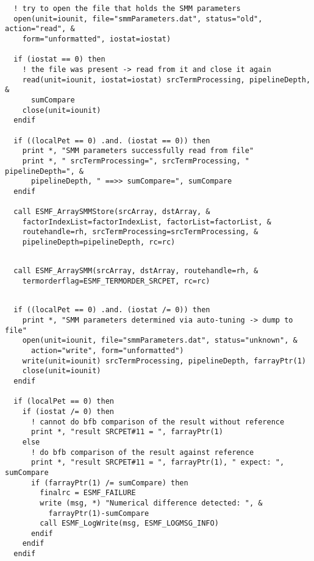  \begin{verbatim}
  ! try to open the file that holds the SMM parameters
  open(unit=iounit, file="smmParameters.dat", status="old", action="read", &
    form="unformatted", iostat=iostat)
  
  if (iostat == 0) then
    ! the file was present -> read from it and close it again
    read(unit=iounit, iostat=iostat) srcTermProcessing, pipelineDepth, &
      sumCompare
    close(unit=iounit)
  endif
  
  if ((localPet == 0) .and. (iostat == 0)) then
    print *, "SMM parameters successfully read from file"
    print *, " srcTermProcessing=", srcTermProcessing, " pipelineDepth=", &
      pipelineDepth, " ==>> sumCompare=", sumCompare
  endif

  call ESMF_ArraySMMStore(srcArray, dstArray, &
    factorIndexList=factorIndexList, factorList=factorList, &
    routehandle=rh, srcTermProcessing=srcTermProcessing, &
    pipelineDepth=pipelineDepth, rc=rc)
 
\end{verbatim}
 

 \begin{verbatim}
  call ESMF_ArraySMM(srcArray, dstArray, routehandle=rh, &
    termorderflag=ESMF_TERMORDER_SRCPET, rc=rc)
 
\end{verbatim}
 

 \begin{verbatim}
  if ((localPet == 0) .and. (iostat /= 0)) then
    print *, "SMM parameters determined via auto-tuning -> dump to file"
    open(unit=iounit, file="smmParameters.dat", status="unknown", &
      action="write", form="unformatted")
    write(unit=iounit) srcTermProcessing, pipelineDepth, farrayPtr(1)
    close(unit=iounit)
  endif
  
  if (localPet == 0) then
    if (iostat /= 0) then
      ! cannot do bfb comparison of the result without reference
      print *, "result SRCPET#11 = ", farrayPtr(1)
    else
      ! do bfb comparison of the result against reference
      print *, "result SRCPET#11 = ", farrayPtr(1), " expect: ", sumCompare
      if (farrayPtr(1) /= sumCompare) then
        finalrc = ESMF_FAILURE
        write (msg, *) "Numerical difference detected: ", &
          farrayPtr(1)-sumCompare
        call ESMF_LogWrite(msg, ESMF_LOGMSG_INFO)
      endif
    endif
  endif
 
\end{verbatim}
 
